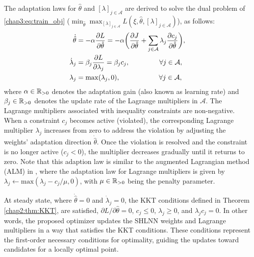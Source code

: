 The adaptation laws for $\hat\theta$ and $[\lambda]_{j\in\mathcal A}$ are derived to solve the dual problem of \eqref{chap3:eq:train_obj} (\ie  $\min_{\hat\theta} \max_{[\lambda]_{j\in\mathcal A}}L(\xi,\hat\theta,[\lambda]_{j\in\mathcal A})$), as follows:
\begin{subequations}
    \begin{align}
            \dot {\hat\theta}&=-\alpha {\partial L\over\partial \hat\theta}
            =-\alpha 
            \bigg(
            {\partial J\over \partial \hat\theta}+\sum_{j\in\mathcal{A}}
            \lambda_j {\partial c_j\over\partial \hat\theta}
            \bigg),
        \label{chap3:eq:adap_th}
            \\
            \dot\lambda_j& = \beta_j{\partial L\over\partial \lambda_j} = \beta_j c_j ,
            \quad\quad\quad\quad      \      
            \forall j\in\mathcal A,
        \label{chap3:eq:adap_L}
            \\
            \lambda_j & = \max(\lambda_j,0) ,
            \quad\quad\quad\quad\ \ \ \ \ 
            \forall j\in\mathcal A,
        \label{chap3:eq:adap_L_max}
    \end{align}
    \label{chap3:eq:adap}
\end{subequations}
where $\alpha\in\mathbb{R}_{>0}$ denotes the adaptation gain (also known as learning rate) and $\beta_j\in\mathbb{R}_{>0}$ denotes the update rate of the Lagrange multipliers in $\mathcal A$. 
The Lagrange multipliers associated with inequality constraints are non-negative.
When a constraint $c_j$ becomes active (\ie violated), the corresponding Lagrange multiplier $\lambda_j$ increases from zero to address the violation by adjusting the weights' adaptation direction $\dot{\hat\theta}$. 
Once the violation is resolved and the constraint is no longer active (\ie $c_j < 0$), the multiplier decreases gradually until it returns to zero. 
Note that this adaption law is similar to the augmented Lagrangian method (ALM) in \cite{RN22}, where the adaptation law for Lagrange multipliers is given by $\lambda_j\leftarrow \text{max}(\lambda_j-c_j/\mu,0)$, with $\mu\in\mathbb{R}_{>0}$ being the penalty parameter. 
    
At steady state, where $\dot{\hat\theta}=0$ and $\dot\lambda_j=0$, the KKT conditions defined in Theorem \ref{chap2:thm:KKT}, are satisfied, \ie $\partial L/\partial \hat\theta=0$, $c_j \le 0$, $\lambda_j \ge 0$, and $\lambda_j c_j=0$.
In other words, the proposed optimizer updates the SHLNN weights and Lagrange multipliers in a way that satisfies the KKT conditions. 
These conditions represent the first-order necessary conditions for optimality, guiding the updates toward candidates for a locally optimal point.

